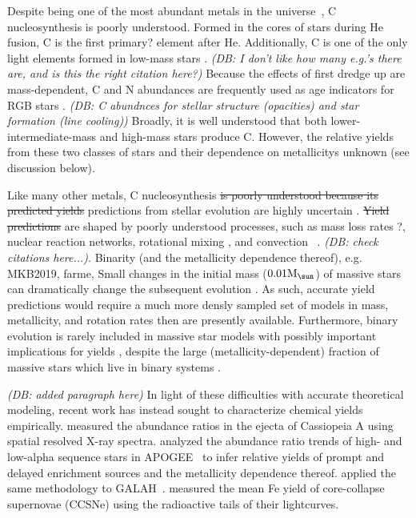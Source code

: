 \documentclass[fleqn,
usenatbib]{mnras}
\newcommand{\Mo}{%
    \ifmmode {\rm M}_{\sun}%
    \else {M$_{\sun}$}%
    \fi}
\newcommand{\strike}[1]{{\color{ForestGreen} \sout{#1}}}
\newcommand{\add}[1]{{\color{ForestGreen} #1}}
\newcommand{\dbstrike}[1]{{\color{Thistle} \sout{#1}}}
\newcommand{\dbadd}[1]{{\color{Thistle} #1}}
\newcommand{\dbnote}[1]{{\color{Thistle} \textit{\small (DB: #1)}}}
\begin{document}
Despite being one of the most abundant metals in the universe~\citep[e.g.][]{asplund+09}, C nucleosynthesis is poorly understood.
Formed in the cores of stars during He fusion, C is the first \dbadd{primary? element} after He. Additionally, C is one of the only light elements formed in low-mass stars \citep[e.g.,][]{KL14}. \dbnote{I don't like how many e.g.'s there are, and is this the right citation here?}
\dbadd{
Because the effects of first dredge up are mass-dependent, C and N abundances are frequently used as age indicators for RGB stars \citep{MG15, martig16, hasselquist19, vincenzo+21}. 
}
\dbnote{C abundnces for stellar structure (opacities) and star formation (line cooling)}
Broadly, it is well understood that both lower-intermediate-mass and high-mass stars produce C. However, the relative yields from these two classes of stars and their dependence on  metallicitys unknown \add{(see discussion below)}.




Like many other metals, C nucleosynthesis \dbstrike{is poorly understood because its predicted yields} \dbadd{predictions from stellar evolution are highly uncertain \citep[see reviews][]{romano+10, KL14}}.
\strike{Yield predictions} are shaped by poorly understood processes, such as mass loss rates \citep{ventura+13}?, nuclear reaction networks, rotational mixing \citep{frischknecht+16, LC18}, and convection ~\citep{chieffi2001}. \dbnote{check citations here...}. 
Binarity (and the metallicity dependence thereof), e.g. MKB2019, farme,
Small changes in the initial mass ($0.01\Mo$) of massive stars can dramatically change the subsequent evolution \citep{bruenn+2023, emily+21}. As such, accurate yield predictions would require a much more densly sampled set of models in mass, metallicity, and rotation rates then are presently available. Furthermore, binary evolution is rarely included in massive star models with possibly important implications for yields \citep{farmer+21}, despite the large (metallicity-dependent) fraction of massive stars which live in binary systems \citep{MKB2019}.

\dbnote{added paragraph here}
In light of these difficulties with accurate theoretical modeling, recent work has instead sought to characterize chemical yields empirically.
\citet{HLA20} measured the abundance ratios in the ejecta of Cassiopeia A using spatial resolved X-ray spectra.
\citet{weinberg+19, weinberg+22} analyzed the abundance ratio trends of high- and low-alpha sequence stars in APOGEE~\citep{apogee17} to infer relative yields of prompt and delayed enrichment sources and the metallicity dependence thereof.
\citet{emily+19, emily+22, emily+23} applied the same methodology to GALAH~\citep{DeSilva2015, Martell2017}.
\citet{rodriguez+21, rodriguez+23} measured the mean Fe yield of core-collapse supernovae (CCSNe) using the radioactive tails of their lightcurves.
\end{document}
